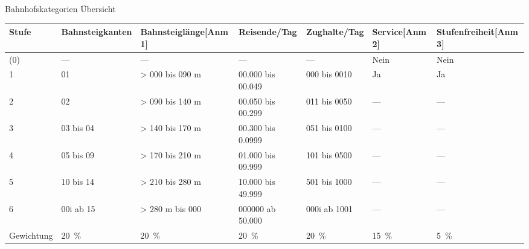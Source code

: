 \documentclass[ignorenonframetext,]{beamer}
\begin{document}
\begin{frame}{Bahnhofskategorien Übersicht}

\begin{longtable}[]{@{}lllllll@{}}
\toprule
Stufe & Bahnsteigkanten & Bahnsteiglänge{[}Anm 1{]} & Reisende/Tag &
Zughalte/Tag & Service{[}Anm 2{]} & Stufenfreiheit{[}Anm
3{]}\tabularnewline
\midrule
\endhead
(0) & --- & --- & --- & --- & Nein & Nein\tabularnewline
1 & 01 & \textgreater{} 000 bis 090 m & 00.000 bis 00.049 & 000 bis 0010
& Ja & Ja\tabularnewline
2 & 02 & \textgreater{} 090 bis 140 m & 00.050 bis 00.299 & 011 bis 0050
& --- & ---\tabularnewline
3 & 03 bis 04 & \textgreater{} 140 bis 170 m & 00.300 bis 0.0999 & 051
bis 0100 & --- & ---\tabularnewline
4 & 05 bis 09 & \textgreater{} 170 bis 210 m & 01.000 bis 09.999 & 101
bis 0500 & --- & ---\tabularnewline
5 & 10 bis 14 & \textgreater{} 210 bis 280 m & 10.000 bis 49.999 & 501
bis 1000 & --- & ---\tabularnewline
6 & 00i ab 15 & \textgreater{} 280 m bis 000 & 000000 ab 50.000 & 000i
ab 1001 & --- & ---\tabularnewline
Gewichtung & 20~\% & 20~\% & 20~\% & 20~\% & 15~\% & 5~\%\tabularnewline
\bottomrule
\end{longtable}

\end{frame}
\end{document}
